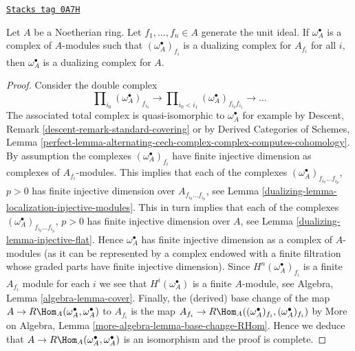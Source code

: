 \begin{lemma}
\label{dualizing-lemma-dualizing-glue}
\href{https://stacks.math.columbia.edu/tag/0A7H}{\texttt{Stacks tag 0A7H}}

Let $A$ be a Noetherian ring. Let $f_1, \ldots, f_n \in A$
generate the unit ideal. If $\omega_A^\bullet$ is a complex
of $A$-modules such that $(\omega_A^\bullet)_{f_i}$ is a dualizing
complex for $A_{f_i}$ for all $i$, then $\omega_A^\bullet$ is a dualizing
complex for $A$.
\end{lemma}

\begin{proof}

Consider the double complex
$$
\prod\nolimits_{i_0} (\omega_A^\bullet)_{f_{i_0}}
\to
\prod\nolimits_{i_0 < i_1} (\omega_A^\bullet)_{f_{i_0}f_{i_1}}
\to \ldots
$$
The associated total complex is quasi-isomorphic to $\omega_A^\bullet$
for example by Descent, Remark \ref{descent-remark-standard-covering}
or by
Derived Categories of Schemes, Lemma
\ref{perfect-lemma-alternating-cech-complex-complex-computes-cohomology}.
By assumption the complexes $(\omega_A^\bullet)_{f_i}$ have
finite injective dimension as complexes of $A_{f_i}$-modules.
This implies that each of the complexes
$(\omega_A^\bullet)_{f_{i_0} \ldots f_{i_p}}$, $p > 0$ has
finite injective dimension over $A_{f_{i_0} \ldots f_{i_p}}$,
see Lemma \ref{dualizing-lemma-localization-injective-modules}.
This in turn implies that each of the complexes
$(\omega_A^\bullet)_{f_{i_0} \ldots f_{i_p}}$, $p > 0$ has
finite injective dimension over $A$, see
Lemma \ref{dualizing-lemma-injective-flat}. Hence $\omega_A^\bullet$
has finite injective dimension as a complex of $A$-modules
(as it can be represented by a complex endowed with
a finite filtration whose graded parts have finite injective
dimension). Since $H^n(\omega_A^\bullet)_{f_i}$ is a finite
$A_{f_i}$ module for each $i$ we see that $H^i(\omega_A^\bullet)$
is a finite $A$-module, see Algebra, Lemma \ref{algebra-lemma-cover}.
Finally, the (derived) base change of the map
$A \to R\Hom_A(\omega_A^\bullet, \omega_A^\bullet)$ to $A_{f_i}$
is the map
$A_{f_i} \to R\Hom_A((\omega_A^\bullet)_{f_i}, (\omega_A^\bullet)_{f_i})$ by
More on Algebra, Lemma \ref{more-algebra-lemma-base-change-RHom}.
Hence we deduce that
$A \to R\Hom_A(\omega_A^\bullet, \omega_A^\bullet)$
is an isomorphism and the proof is complete.
\end{proof}

